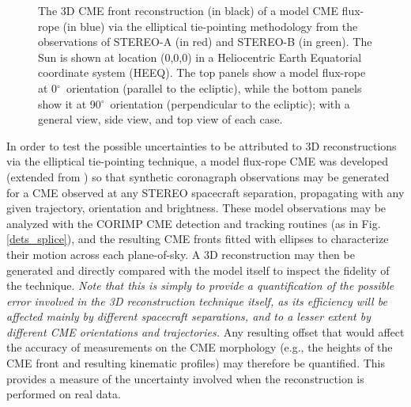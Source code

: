 \documentclass[preprint2]{aastex}
\begin{document}
\begin{figure}
\caption{The 3D CME front reconstruction (in black) of a model CME flux-rope (in blue) via the elliptical tie-pointing methodology from the observations of STEREO-A (in red) and STEREO-B (in green). The Sun is shown at location (0,0,0) in a Heliocentric Earth Equatorial coordinate system (HEEQ). The top panels show a model flux-rope at 0$^{\circ}$~orientation (parallel to the ecliptic), while the bottom panels show it at 90$^{\circ}$~orientation (perpendicular to the ecliptic); with a general view, side view, and top view of each case.}
\label{3d_panels}
\end{figure}


In order to test the possible uncertainties to be attributed to 3D reconstructions via the elliptical tie-pointing technique, a model flux-rope CME was developed (extended from \citealt{2012ApJ...752..144M}) so that synthetic coronagraph observations may be generated for a  CME observed at any STEREO spacecraft separation, propagating with any given trajectory, orientation and brightness. These model observations may be analyzed with the CORIMP CME detection and tracking routines (as in Fig.\,\ref{dets_splice}), and the resulting CME fronts fitted with ellipses to characterize their motion across each plane-of-sky. A 3D reconstruction may then be generated and directly compared with the model itself to inspect the fidelity of the technique. \emph{Note that this is simply to provide a quantification of the possible error involved in the 3D reconstruction technique itself, as its efficiency will be affected mainly by different spacecraft separations, and to a lesser extent by different CME orientations and trajectories.} Any resulting offset that would affect the accuracy of measurements on the CME morphology (e.g., the heights of the CME front and resulting kinematic profiles) may therefore be quantified. This provides a measure of the uncertainty involved when the reconstruction is performed on real data.
\end{document}
